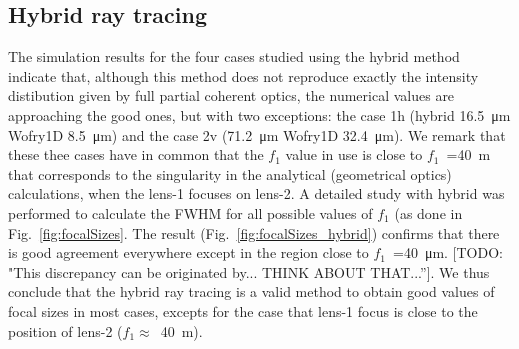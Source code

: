 \documentclass{iucr}              %
\newcommand{\todo}[1]{{\color{red}[TODO: "#1'']}}
\begin{document}
\subsection{Hybrid ray tracing}

The simulation results for the four cases studied using the hybrid method indicate that, although this method does not reproduce exactly the intensity distibution given by full partial coherent optics, the numerical values are approaching the good ones, but with two exceptions: the case 
1h (hybrid \SI{16.5}{\micro\meter} Wofry1D \SI{8.5}{\micro\meter}) and the case 
2v (\SI{71.2}{\micro\meter} Wofry1D \SI{32.4}{\micro\meter}). 
We remark that these thee cases have in common that the $f_1$ value in use is close to $f_1$~=\SI{40}{\meter} that corresponds to the singularity in the analytical (geometrical optics) calculations, when the lens-1 focuses on lens-2. A detailed study with hybrid was performed to calculate the FWHM for all possible values of $f_1$ (as done in Fig.~\ref{fig:focalSizes}. The result (Fig.~\ref{fig:focalSizes_hybrid}) confirms that there is good agreement everywhere except in the region close to $f_1$~=\SI{40}{\micro\meter}.  \todo{This discrepancy can be originated by... THINK ABOUT THAT...}. We thus conclude that the hybrid ray tracing is a valid method to obtain good values of focal sizes in most cases, excepts for the case that lens-1 focus is close to the position of lens-2 ($f_1 \approx $~\SI{40}{\meter}).
\end{document}
